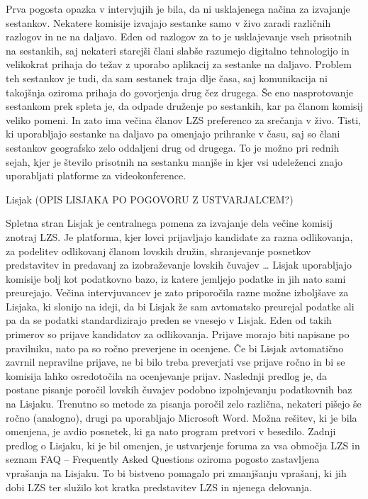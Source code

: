 \documentclass[a4paper,12pt,openright]{book}
\begin{document}
Prva pogosta opazka v intervjujih je bila, da ni usklajenega načina za izvajanje sestankov. 
Nekatere komisije izvajajo sestanke samo v živo zaradi različnih razlogov in ne na daljavo. 
Eden od razlogov za to je usklajevanje vseh prisotnih na sestankih, saj nekateri starejši člani slabše razumejo digitalno tehnologijo in velikokrat prihaja do težav z uporabo aplikacij za sestanke na daljavo. 
Problem teh sestankov je tudi, da sam sestanek traja dlje časa, saj komunikacija ni takojšnja oziroma prihaja do govorjenja drug čez drugega. 
Še eno nasprotovanje sestankom prek spleta je, da odpade druženje po sestankih, kar pa članom komisij veliko pomeni. 
In zato ima večina članov LZS preferenco za srečanja v živo.
Tisti, ki uporabljajo sestanke na daljavo pa omenjajo prihranke v času, saj so člani sestankov geografsko zelo oddaljeni drug od drugega. 
To je možno pri rednih sejah, kjer je število prisotnih na sestanku manjše in kjer vsi udeleženci znajo uporabljati platforme za videokonference.

Lisjak
	(OPIS LISJAKA PO POGOVORU Z USTVARJALCEM?)
 
Spletna stran Lisjak je centralnega pomena za izvajanje dela večine komisij znotraj LZS. 
Je platforma, kjer lovci prijavljajo kandidate za razna odlikovanja, za podelitev odlikovanj članom lovskih družin, shranjevanje posnetkov predstavitev in predavanj za izobraževanje lovskih čuvajev …
Lisjak uporabljajo komisije bolj kot podatkovno bazo, iz katere jemljejo podatke in jih nato sami preurejajo. 
Večina intervjuvancev je zato priporočila razne možne izboljšave za Lisjaka, ki slonijo na ideji, da bi Lisjak že sam avtomatsko preurejal podatke ali pa da se podatki standardizirajo preden se vnesejo v Lisjak.  
Eden od takih primerov so prijave kandidatov za odlikovanja.
Prijave morajo biti napisane po pravilniku, nato pa so ročno preverjene in ocenjene. 
Če bi Lisjak avtomatično zavrnil nepravilne prijave, ne bi bilo treba preverjati vse prijave ročno in bi se komisija lahko osredotočila na ocenjevanje prijav. 
Naslednji predlog je, da postane pisanje poročil lovskih čuvajev podobno izpolnjevanju podatkovnih baz na Lisjaku.
Trenutno so metode za pisanja poročil zelo različna, nekateri pišejo še ročno (analogno), drugi pa uporabljajo Microsoft Word.
Možna rešitev, ki je bila omenjena, je avdio posnetek, ki ga nato program pretvori v besedilo. 
Zadnji predlog o Lisjaku, ki je bil omenjen, je ustvarjenje foruma za vsa območja LZS in seznam FAQ –  Frequently Asked Questions oziroma pogosto zastavljena vprašanja na Lisjaku. 
To bi bistveno pomagalo pri zmanjšanju vprašanj, ki jih dobi LZS ter služilo kot kratka predstavitev LZS in njenega delovanja.
\end{document}
